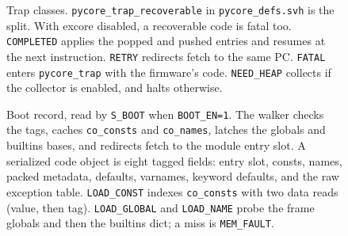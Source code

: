 \begin{figure}[htbp]
\centering
{}
\caption{Trap classes.
\texttt{pycore\_trap\_recoverable} in \texttt{pycore\_defs.svh} is the split.
With excore disabled, a recoverable code is fatal too.
\texttt{COMPLETED} applies the popped and pushed entries and resumes at the next instruction.
\texttt{RETRY} redirects fetch to the same PC.
\texttt{FATAL} enters \texttt{pycore\_trap} with the firmware's code.
\texttt{NEED\_HEAP} collects if the collector is enabled, and halts otherwise.}
\label{fig:traps}
\end{figure}

\begin{figure}[htbp]
\centering
{}
\caption{Boot record, read by \texttt{S\_BOOT} when \texttt{BOOT\_EN=1}.
The walker checks the tags, caches \texttt{co\_consts} and \texttt{co\_names}, latches the globals and builtins bases, and redirects fetch to the module entry slot.
A serialized code object is eight tagged fields: entry slot, consts, names, packed metadata, defaults, varnames, keyword defaults, and the raw exception table.
\texttt{LOAD\_CONST} indexes \texttt{co\_consts} with two data reads (value, then tag).
\texttt{LOAD\_GLOBAL} and \texttt{LOAD\_NAME} probe the frame globals and then the builtins dict; a miss is \texttt{MEM\_FAULT}.}
\label{fig:boot}
\end{figure}
